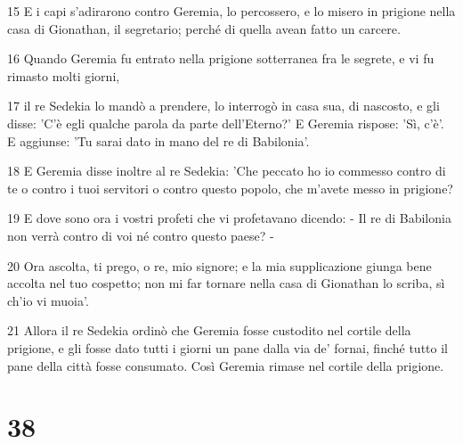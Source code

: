 \par 15 E i capi s'adirarono contro Geremia, lo percossero, e lo misero in prigione nella casa di Gionathan, il segretario; perché di quella avean fatto un carcere.
\par 16 Quando Geremia fu entrato nella prigione sotterranea fra le segrete, e vi fu rimasto molti giorni,
\par 17 il re Sedekia lo mandò a prendere, lo interrogò in casa sua, di nascosto, e gli disse: 'C'è egli qualche parola da parte dell'Eterno?' E Geremia rispose: 'Sì, c'è'. E aggiunse: 'Tu sarai dato in mano del re di Babilonia'.
\par 18 E Geremia disse inoltre al re Sedekia: 'Che peccato ho io commesso contro di te o contro i tuoi servitori o contro questo popolo, che m'avete messo in prigione?
\par 19 E dove sono ora i vostri profeti che vi profetavano dicendo: - Il re di Babilonia non verrà contro di voi né contro questo paese? -
\par 20 Ora ascolta, ti prego, o re, mio signore; e la mia supplicazione giunga bene accolta nel tuo cospetto; non mi far tornare nella casa di Gionathan lo scriba, sì ch'io vi muoia'.
\par 21 Allora il re Sedekia ordinò che Geremia fosse custodito nel cortile della prigione, e gli fosse dato tutti i giorni un pane dalla via de' fornai, finché tutto il pane della città fosse consumato. Così Geremia rimase nel cortile della prigione.

\chapter{38}

